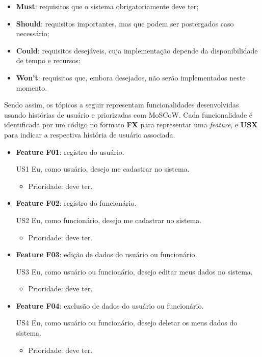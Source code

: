 \begin{itemize}
    \item \textbf{Must}: requisitos que o sistema obrigatoriamente deve ter;
    \item \textbf{Should}: requisitos importantes, mas que podem ser postergados caso necessário;
    \item \textbf{Could}: requisitos desejáveis, cuja implementação depende da disponibilidade de tempo e recursos;
    \item \textbf{Won’t}: requisitos que, embora desejados, não serão implementados neste momento.
\end{itemize}

Sendo assim, os tópicos a seguir representam funcionalidades desenvolvidas usando histórias de usuário e priorizadas com MoSCoW. Cada funcionalidade é identificada por um código no formato \textbf{FX} para representar uma \textit{feature}, e \textbf{USX} para indicar a respectiva história de usuário associada.


\begin{itemize}

    \item \textbf{Feature F01}: registro do usuário.
    
    US1 Eu, como usuário, desejo me cadastrar no sistema.

    \begin{itemize}
        \item Prioridade: deve ter.
    \end{itemize}
    
    \item \textbf{Feature F02}: registro do funcionário.

    US2 Eu, como funcionário, desejo me cadastrar no sistema.

    \begin{itemize}
        \item Prioridade: deve ter.
    \end{itemize}
    
    \item \textbf{Feature F03}: edição de dados do usuário ou funcionário.

    US3 Eu, como usuário ou funcionário, desejo editar meus dados no sistema.

    \begin{itemize}
        \item Prioridade: deve ter.
    \end{itemize}

    \item \textbf{Feature F04}: exclusão de dados do usuário ou funcionário.

    US4 Eu, como usuário ou funcionário, desejo deletar os meus dados do sistema.

    \begin{itemize}
        \item Prioridade: deve ter.
    \end{itemize}
    
\end{itemize}

